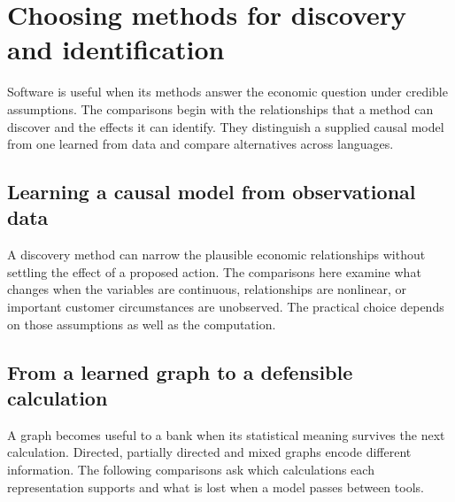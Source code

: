 \documentclass[11pt,a4paper,openany]{book}
\begin{document}





\part{Choosing methods for discovery and identification}
\label{reading:part-methods}
Software is useful when its methods answer the economic question under
credible assumptions. The comparisons begin with the relationships that a
method can discover and the effects it can identify. They distinguish a supplied
causal model from one learned from data and compare alternatives across languages.











\chapter{Learning a causal model from observational data}
A discovery method can narrow the plausible economic relationships without
settling the effect of a proposed action. The comparisons here examine what
changes when the variables are continuous, relationships are nonlinear, or
important customer circumstances are unobserved. The practical choice depends
on those assumptions as well as the computation.












\chapter{From a learned graph to a defensible calculation}
A graph becomes useful to a bank when its statistical meaning survives
the next calculation. Directed, partially directed and mixed graphs encode
different information. The following comparisons ask which calculations each
representation supports and what is lost when a model passes between tools.
\end{document}
